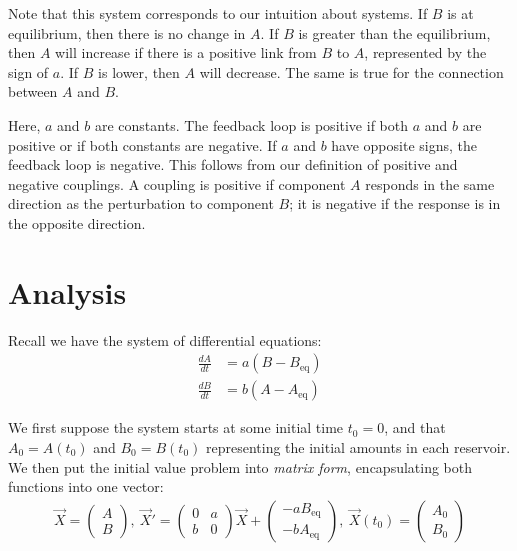 \documentclass[11pt, oneside]{article}
\theoremstyle{plain}
\theoremstyle{definition}
\begin{document}
Note that this system corresponds to our intuition about systems. If \( B \) is
at equilibrium, then there is no change in \( A \). If \( B \) is greater than
the equilibrium, then \( A \) will increase if there is a positive link from
\( B \) to \( A \), represented by the sign of \( a \). If \( B \) is lower,
then \( A \) will decrease. The same is true for the connection between \( A \)
and \( B \).
\begin{displayquote}
  Here, \( a \) and \( b \) are constants. The feedback loop is positive if
  both \( a \) and \( b \) are positive or if both constants are negative.
  If \( a \) and \( b \) have opposite signs, the feedback loop is negative.
  This follows from our definition of positive and negative couplings.
  A coupling is positive if component \( A \) responds in the same direction
  as the perturbation to component \( B \); it is negative if the response
  is in the opposite direction.
\end{displayquote}

\section{Analysis}
Recall we have the system of differential equations:
\begin{align*}
  \frac{dA}{dt} &= a(B - B_\text{eq}) \\
  \frac{dB}{dt} &= b(A - A_\text{eq})
\end{align*}

We first suppose the system starts at some initial time \( t_0 = 0 \),
and that \( A_0 = A(t_0) \) and \( B_0 = B(t_0) \) representing
the initial amounts in each reservoir. We then put the initial value problem
into \textit{matrix form}, encapsulating both functions into one vector:
\begin{align*}
  \vec{X} = \begin{pmatrix} A \\ B \end{pmatrix}, \
  \vec{X}' = \begin{pmatrix} 0 & a \\ b & 0 \end{pmatrix} \vec{X} + 
  \begin{pmatrix} -a B_\text{eq} \\ -b A_\text{eq}
  \end{pmatrix}, \
  \vec{X}(t_0) = \begin{pmatrix} A_0 \\ B_0 \end{pmatrix}
\end{align*}
\end{document}
